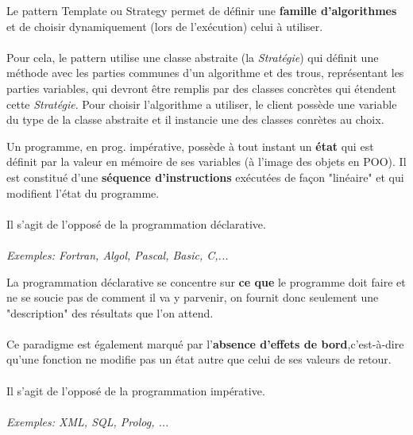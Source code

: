 \item{}
{\vrai}
{Le pattern Template ou Strategy permet de définir une \textbf{famille d'algorithmes} et de choisir dynamiquement (lors de l'exécution) celui à utiliser.
\paragraph{}
Pour cela, le pattern utilise une classe abstraite (la \textit{Stratégie}) qui définit une méthode avec les parties communes d'un algorithme et des trous, représentant les parties variables, qui devront être remplis par des classes concrètes qui étendent cette \textit{Stratégie}. Pour choisir l'algorithme a utiliser, le client possède une variable du type de la classe abstraite et il instancie une des classes conrètes au choix.
}


\item{}
{\vrai}
{Un programme, en prog. impérative, possède à tout instant un \textbf{état} qui est définit par la valeur en mémoire de ses variables (à l'image des objets en POO). Il est constitué d'une \textbf{séquence d'instructions} exécutées de façon "linéaire" et qui modifient l'état du programme. 
\paragraph{}
Il s'agit de l'opposé de la programmation déclarative.
\paragraph{}
\textit{Exemples: Fortran, Algol, Pascal, Basic, C,...}
}


\item{}
{\faux}
{La programmation déclarative se concentre sur \textbf{ce que} le programme doit faire et ne se soucie pas de comment il va y parvenir, on fournit donc seulement une "description" des résultats que l'on attend.
\paragraph{}
Ce paradigme est également marqué par l'\textbf{absence d'effets de bord},c'est-à-dire qu'une fonction ne modifie pas un état autre que celui de ses valeurs de retour.
\paragraph{}
Il s'agit de l'opposé de la programmation impérative.
\paragraph{}
\textit{Exemples: XML, SQL, Prolog, ...}

}


